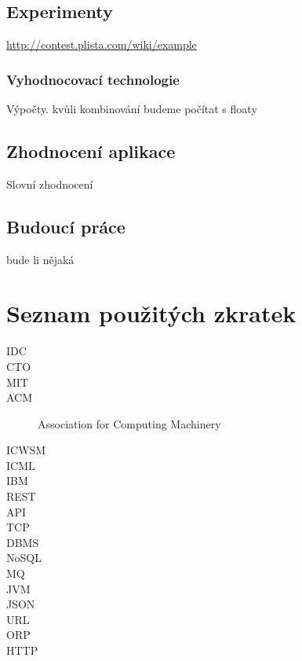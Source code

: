 \documentclass[thesis=M,czech]{FITthesis}[2014/05/07]
\begin{document}
\section{Experimenty}

\url{http://contest.plista.com/wiki/example}
	\subsection{Vyhodnocovací technologie}	
	Výpočty. kvůli kombinování budeme počítat s floaty
	

\section{Zhodnocení aplikace}
Slovní zhodnocení
\section{Budoucí práce}
bude li nějaká

\begin{conclusion}
\end{conclusion}




\appendix

\chapter{Seznam použitých zkratek}
\begin{description}
	\item[IDC] 
	\item[CTO]
	\item[MIT]	
	\item[ACM] Association for Computing Machinery	
	\item[ICWSM]	
	\item[ICML]	
	\item[IBM]	
	\item[REST]	
	\item[API]							
	\item[TCP]
	\item[DBMS]
	\item[NoSQL]
	\item[MQ]
	\item[JVM]
	\item[JSON]
	\item[URL]
	\item[ORP]
	\item[HTTP]
\end{description}
\end{document}
